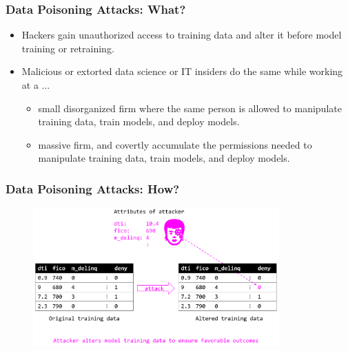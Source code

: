 \documentclass[11pt,
               aspectratio=169,
               hyperref={colorlinks}
               ]{beamer}
\begin{document}
			\begin{frame}
		
				\frametitle{Data Poisoning Attacks: \textbf{What?}}
				
				\begin{itemize}
					\item Hackers gain unauthorized access to training data and alter it before model training or retraining.
					\item Malicious or extorted data science or IT insiders do the same while working at a ...
					\begin{itemize}
						\item small disorganized firm where the same person is allowed to manipulate training data, train models, and deploy models.
						\item massive firm, and covertly accumulate the permissions needed to manipulate training data, train models, and deploy models.
					\end{itemize}
				\end{itemize}
			
			\end{frame}
			
			\begin{frame}
		
				\frametitle{Data Poisoning Attacks: \textbf{How?}}		
			
				\begin{figure}[htb]
					\begin{center}
						\includegraphics[height=150pt]{img/poison.png}
					\end{center}
				\end{figure}	
		
			\end{frame}
		
\end{document}
